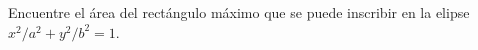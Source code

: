\item Encuentre el área del rectángulo máximo que se puede inscribir en la elipse $x^2/a^2 + y^2/b^2 = 1$.
